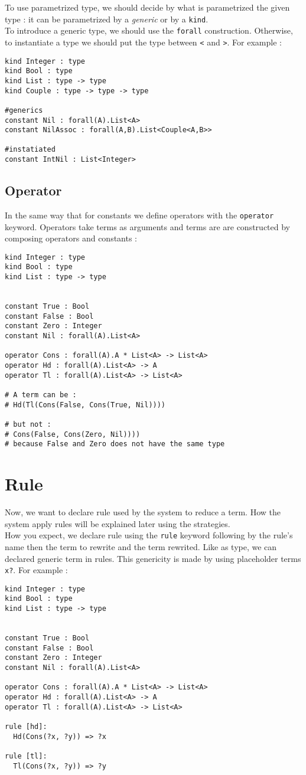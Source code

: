 \documentclass[12pt,a4paper]{article}
\begin{document}
To use parametrized type, we should decide by what is parametrized the
given type : it can be parametrized by a \emph{generic} or by a
\verb?kind?.\\
To introduce a generic type, we should use the \verb?forall?
construction. Otherwise, to instantiate a type we should put the type
between \verb?<? and \verb?>?. For example :

\begin{verbatim}
kind Integer : type
kind Bool : type
kind List : type -> type
kind Couple : type -> type -> type

#generics
constant Nil : forall(A).List<A>
constant NilAssoc : forall(A,B).List<Couple<A,B>>

#instatiated
constant IntNil : List<Integer>
\end{verbatim}

\subsection{Operator}
In the same way that for constants we define operators with the
\verb?operator? keyword. Operators take terms as arguments and terms
are are constructed by composing operators and constants :

\begin{verbatim}
kind Integer : type
kind Bool : type
kind List : type -> type


constant True : Bool
constant False : Bool
constant Zero : Integer
constant Nil : forall(A).List<A>

operator Cons : forall(A).A * List<A> -> List<A>
operator Hd : forall(A).List<A> -> A
operator Tl : forall(A).List<A> -> List<A>

# A term can be :
# Hd(Tl(Cons(False, Cons(True, Nil))))

# but not :
# Cons(False, Cons(Zero, Nil))))
# because False and Zero does not have the same type
\end{verbatim}

\section{Rule}
Now, we want to declare rule used by the system to reduce a term.
How the system apply rules will be explained later using the
strategies.\\
How you expect, we declare rule using the \verb?rule? keyword
following by the rule's name then the term to rewrite and the term
rewrited. Like as type, we can declared generic term in rules. This
genericity is made by using placeholder terms \verb!x?!. For example :
\begin{verbatim}
kind Integer : type
kind Bool : type
kind List : type -> type


constant True : Bool
constant False : Bool
constant Zero : Integer
constant Nil : forall(A).List<A>

operator Cons : forall(A).A * List<A> -> List<A>
operator Hd : forall(A).List<A> -> A
operator Tl : forall(A).List<A> -> List<A>

rule [hd]:
  Hd(Cons(?x, ?y)) => ?x

rule [tl]:
  Tl(Cons(?x, ?y)) => ?y
\end{verbatim}
\end{document}
